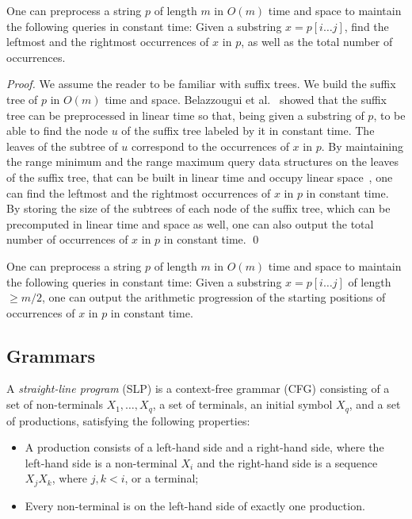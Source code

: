 \begin{proposition}
\label{prop:suffix_tree}
One can preprocess a string $p$ of length $m$ in $O(m)$ time and space to maintain the following queries in constant time: Given a substring $x = p[i \dots j]$, find the leftmost and the rightmost occurrences of $x$ in $p$, as well as the total number of occurrences.  
\end{proposition}
\begin{proof}
We assume the reader to be familiar with suffix trees. We build the suffix tree of $p$ in $O(m)$ time and space. Belazzougui et al.~\cite{belazzougui_et_al:LIPIcs.CPM.2021.8} showed that the suffix tree can be preprocessed in linear time so that, being given a substring of $p$, to be able to find the node $u$ of the suffix tree labeled by it in constant time. The leaves of the subtree of $u$ correspond to the occurrences of $x$ in $p$. By maintaining the range minimum and the range maximum query data structures on the leaves of the suffix tree, that can be built in linear time and occupy linear space~\cite{10.1007/11780441_5}, one can find the leftmost and the rightmost occurrences of $x$ in $p$ in constant time. By storing the size of the subtrees of each node of the suffix tree, which can be precomputed in linear time and space as well, one can also output the total number of occurrences of $x$ in $p$ in constant time. 
\qed   
\end{proof}

\begin{corollary}
\label{cor:imp}
One can preprocess a string $p$ of length $m$ in $O(m)$ time and space to maintain the following queries in constant time: Given a substring $x = p[i \dots j]$ of length $\ge m/2$, one can output the arithmetic progression of the starting positions of occurrences of $x$ in $p$ in constant time.
\end{corollary}



\subsection{Grammars}
\begin{definition}
A \emph{straight-line program} (SLP)  is a context-free grammar (CFG) consisting of a set of non-terminals $X_1, \ldots, X_q$, a set of terminals, an initial symbol $X_q$, and a set of productions, satisfying the following properties:
\begin{itemize}
\item A production consists of a left-hand side and a right-hand side, where the left-hand side is a non-terminal $X_i$ and the right-hand side is a sequence $X_jX_k$, where $j,k < i$, or a terminal;
\item Every non-terminal is on the left-hand side of exactly one production.
\end{itemize}
\end{definition}


